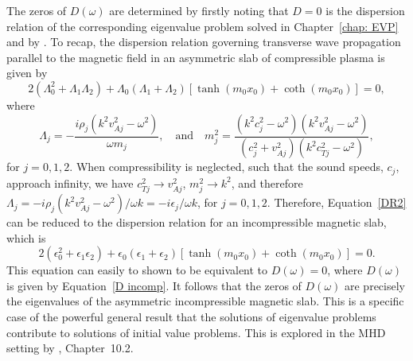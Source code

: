 The zeros of $D(\omega)$ are determined by firstly noting that $D=0$ is the dispersion relation of the corresponding eigenvalue problem solved in Chapter~\ref{chap: EVP} and by \cite{zsa_etal18}. To recap, the dispersion relation governing transverse wave propagation parallel to the magnetic field in an asymmetric slab of compressible plasma is given by
\begin{equation}
2(\Lambda_0^2 + \Lambda_1 \Lambda_2) + \Lambda_0(\Lambda_1 + \Lambda_2)[\tanh(m_0x_0) + \coth(m_0x_0)] = 0,
\label{DR2}
\end{equation}
where
\begin{equation}
\Lambda_j = -\frac{i\rho_j(k^2v_{Aj}^2 - \omega^2)}{\omega m_j},
\quad
\text{and}
\quad
m_j^2 = \frac{(k^2c_j^2 - \omega^2)(k^2v_{Aj}^2 - \omega^2)}{(c_j^2 + v_{Aj}^2)(k^2c_{Tj}^2 - \omega^2)},
\end{equation}
for $j = 0, 1, 2$. When compressibility is neglected, such that the sound speeds, $c_j$, approach infinity, we have $c_{Tj}^2 \to v_{Aj}^2$, $m_j^2 \to k^2$, and therefore $\Lambda_j = -i\rho_j(k^2v_{Aj}^2 - \omega^2)/\omega k = -i\epsilon_j / \omega k$, for $j=0,1,2$. Therefore, Equation~\eqref{DR2} can be reduced to the dispersion relation for an incompressible magnetic slab, which is
\begin{equation}
2\left(\epsilon_0^2 + \epsilon_1 \epsilon_2\right) + \epsilon_0(\epsilon_1 + \epsilon_2)[\tanh(m_0x_0) + \coth(m_0x_0)] = 0.
\end{equation}
This equation can easily to shown to be equivalent to $D(\omega) = 0$, where $D(\omega)$ is given by Equation~\eqref{D incomp}. It follows that the zeros of $D(\omega)$ are precisely the eigenvalues of the asymmetric incompressible magnetic slab. This is a specific case of the powerful general result that the solutions of eigenvalue problems contribute to solutions of initial value problems. This is explored in the MHD setting by \cite{goe_etal04}, Chapter~10.2.

